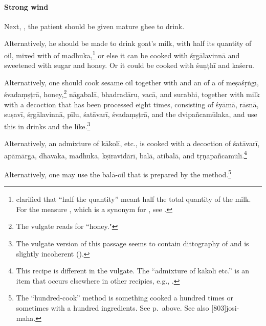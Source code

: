 \begin{translation}
\paragraph{Strong wind}    
    Next, , the
    patient should be given mature ghee to drink.

Alternatively, he should be made to drink goat's milk, with half its
quantity of oil, mixed with  of
\gls{madhuka},\footnote{ clarified that “half the
    quantity” meant half the total quantity of the milk. For the measure
    , which is a synonym for , see
    \cite[263]{wuja-2003}.}  or else it can be cooked with
    \gls{śṛgālavinnā} and sweetened with sugar and honey. Or it could be
    cooked with \gls{śuṇṭhī} and \gls{kaśeru}.

Alternatively, one should cook sesame oil together with and an
 of a  of \gls{meṣaśṛṅgī},
\gls{śvadaṃṣṭrā}, honey,\footnote{The vulgate reads  for
    “honey."} \gls{nāgabalā}, \gls{bhadradāru}, \gls{vacā}, and
    \gls{surabhi}, together with milk with a decoction that has been
    processed eight times, consisting of \gls{śyāmā}, \gls{rāsnā},
    \gls{suṣavī}, \gls{śṛgālavinnā}, \gls{pīlu}, \gls{śatāvarī},
    \gls{śvadaṃṣṭrā}, and the \gls{dvipañcamūlaka}, and use this in drinks
    and the like.\footnote{The vulgate version of this passage seems to
        contain dittography of  and is slightly incoherent
        (\cite[424]{vulgate}).}

Alternatively, an admixture of \gls{kākolī}, etc., is
cooked with a decoction of
\gls{śatāvarī}, \gls{apāmārga},
\gls{dhavaka}, \gls{madhuka}, \gls{kṣīravidārī},
\gls{balā},
\gls{atibalā}, and \gls{tṛṇapañcamūlī}.\footnote{This
recipe is different in
the vulgate.  The “admixture of \gls{kākolī} etc.” is
an item that occurs
elsewhere in other recipies, e.g.,
.}


Alternatively, one may use the \gls{balā}-oil that is prepared by the
 method.\footnote{The “hundred-cook” method
    is something cooked a hundred times or sometimes with a hundred
    ingredients. See p.\,\pageref{satapaka} above. See also
    [803]{josi-maha}.}


\end{translation}
